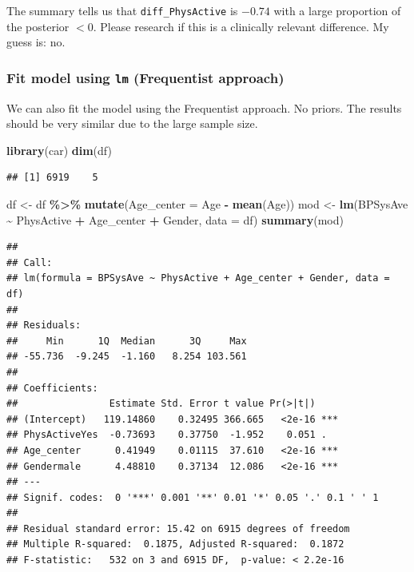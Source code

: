 \documentclass[
]{book}
\newenvironment{Shaded}{\begin{snugshade}}{\end{snugshade}}
\newcommand{\AttributeTok}[1]{\textcolor[rgb]{0.13,0.29,0.53}{#1}}
\newcommand{\FunctionTok}[1]{\textcolor[rgb]{0.13,0.29,0.53}{\textbf{#1}}}
\newcommand{\NormalTok}[1]{#1}
\newcommand{\OtherTok}[1]{\textcolor[rgb]{0.56,0.35,0.01}{#1}}
\newcommand{\SpecialCharTok}[1]{\textcolor[rgb]{0.81,0.36,0.00}{\textbf{#1}}}
\begin{document}
The summary tells us that \texttt{diff\_PhysActive} is \(-0.74\) with a large proportion
of the posterior \(<0\). Please research if this is a clinically relevant difference.
My guess is: no.

\subsubsection{\texorpdfstring{Fit model using \texttt{lm} (Frequentist approach)}{Fit model using lm (Frequentist approach)}}\label{fit-model-using-lm-frequentist-approach}

We can also fit the model using the Frequentist approach.
No priors. The results should be very similar due to the large sample size.

\begin{Shaded}
\begin{Highlighting}[]
\FunctionTok{library}\NormalTok{(car)}
\FunctionTok{dim}\NormalTok{(df) }
\end{Highlighting}
\end{Shaded}

\begin{verbatim}
## [1] 6919    5
\end{verbatim}

\begin{Shaded}
\begin{Highlighting}[]
\NormalTok{df }\OtherTok{\textless{}{-}}\NormalTok{ df }\SpecialCharTok{\%\textgreater{}\%} \FunctionTok{mutate}\NormalTok{(}\AttributeTok{Age\_center =}\NormalTok{ Age }\SpecialCharTok{{-}} \FunctionTok{mean}\NormalTok{(Age))}
\NormalTok{mod }\OtherTok{\textless{}{-}} \FunctionTok{lm}\NormalTok{(BPSysAve }\SpecialCharTok{\textasciitilde{}}\NormalTok{ PhysActive }\SpecialCharTok{+}\NormalTok{ Age\_center }\SpecialCharTok{+}\NormalTok{ Gender, }\AttributeTok{data =}\NormalTok{ df)}
\FunctionTok{summary}\NormalTok{(mod)}
\end{Highlighting}
\end{Shaded}

\begin{verbatim}
## 
## Call:
## lm(formula = BPSysAve ~ PhysActive + Age_center + Gender, data = df)
## 
## Residuals:
##     Min      1Q  Median      3Q     Max 
## -55.736  -9.245  -1.160   8.254 103.561 
## 
## Coefficients:
##                Estimate Std. Error t value Pr(>|t|)    
## (Intercept)   119.14860    0.32495 366.665   <2e-16 ***
## PhysActiveYes  -0.73693    0.37750  -1.952    0.051 .  
## Age_center      0.41949    0.01115  37.610   <2e-16 ***
## Gendermale      4.48810    0.37134  12.086   <2e-16 ***
## ---
## Signif. codes:  0 '***' 0.001 '**' 0.01 '*' 0.05 '.' 0.1 ' ' 1
## 
## Residual standard error: 15.42 on 6915 degrees of freedom
## Multiple R-squared:  0.1875, Adjusted R-squared:  0.1872 
## F-statistic:   532 on 3 and 6915 DF,  p-value: < 2.2e-16
\end{verbatim}
\end{document}
